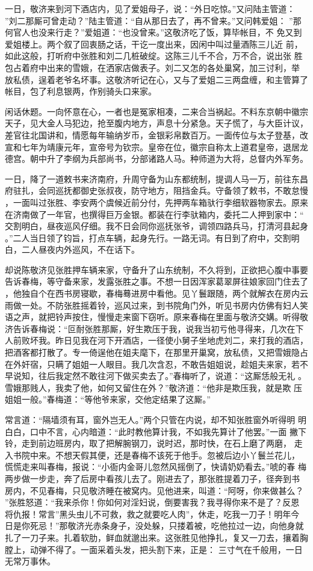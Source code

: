 一日，敬济来到河下酒店内，见了爱姐母子，说：“外日吃惊。”又问陆主管道：
”刘二那厮可曾走动？”陆主管道：“自从那日去了，再不曾来。”又问韩爱姐：
”那何官人也没来行走？”爱姐道：“也没曾来。”这敬济吃了饭，算毕帐目，不
免又到爱姐楼上。两个叙了回衷肠之话，干讫一度出来，因闲中叫过量酒陈三儿近
前，如此这般，打听府中张胜和刘二几桩破绽。这陈三儿千不合，万不合，说出张
胜包占着府中出来的雪娥，在洒家店做表子。刘二又怎的各处巢窝，加三讨利，举
放私债，逞着老爷名坏事。这敬济听记在心，又与了爱姐二三两盘缠，和主管算了
帐目，包了利息银两，作别骑头口来家。

闲话休题。一向怀意在心，一者也是冤家相凑，二来合当祸起。不料东京朝中徽宗
天子，见大金人马犯边，抢至腹内地方，声息十分紧急。天子慌了，与大臣计议，
差官往北国讲和，情愿每年输纳岁币，金银彩帛数百万。一面传位与太子登基，改
宣和七年为靖康元年，宣帝号为钦宗。皇帝在位，徽宗自称太上道君皇帝，退居龙
德宫。朝中升了李纲为兵部尚书，分部诸路人马。种师道为大将，总督内外军务。

一日，降了一道敕书来济南府，升周守备为山东都统制，提调人马一万，前往东昌
府驻扎，会同巡抚都御史张叔夜，防守地方，阻挡金兵。守备领了敕书，不敢怠慢
，一面叫过张胜、李安两个虞候近前分付，先押两车箱驮行李细软器物家去。原来
在济南做了一年官，也撰得巨万金银。都装在行李驮箱内，委托二人押到家中：“
交割明白，昼夜巡风仔细。我不日会同你巡抚张爷，调领四路兵马，打清河县起身
。”二人当日领了钧旨，打点车辆，起身先行。一路无词。有日到了府中，交割明
白，二人昼夜内外巡风，不在话下。

却说陈敬济见张胜押车辆来家，守备升了山东统制，不久将到，正欲把心腹中事要
告诉春梅，等守备来家，发露张胜之事。不想一日因浑家葛翠屏往娘家回门住去了
，他独自个在西书房寝歇，春梅蓦进房中看他。见丫鬟跟随，两个就解衣在房内云
雨做一处。不防张胜摇着铃，巡风过来，到书院角门外，听见书房内仿佛有妇人笑
语之声，就把铃声按住，慢慢走来窗下窃听。原来春梅在里面与敬济交媾。听得敬
济告诉春梅说：“叵耐张胜那厮，好生欺压于我，说我当初亏他寻得来，几次在下
人前败坏我。昨日见我在河下开酒店，一径使小舅子坐地虎刘二，来打我的酒店，
把酒客都打散了。专一倚逞他在姐夫麾下，在那里开巢窝，放私债，又把雪娥隐占
在外奸宿，只瞒了姐姐一人眼目。我几次含忍，不敢告姐姐说，趁姐夫来家，若不
早说知，往后我定然不敢往河下做买卖去了。”春梅听了，说道：“这厮恁般无礼
。雪娥那贱人，我卖了他，如何又留住在外？”敬济道：“他非是欺压我，就是欺
压姐姐一般。”春梅道：“等他爷来家，交他定结果了这厮。”

常言道：“隔墙须有耳，窗外岂无人。”两个只管在内说，却不知张胜窗外听得明
明白白，口中不言，心内暗道：“此时教他算计我，不如我先算计了他罢。”一面
撇下铃，走到前边班房内，取了把解腕钢刀，说时迟，那时快，在石上磨了两磨，
走入书院中来。不想天假其便，还是春梅不该死于他手。忽被后边小丫鬟兰花儿，
慌慌走来叫春梅，报说：“小衙内金哥儿忽然风摇倒了，快请奶奶看去。”唬的春
梅两步做一步走，奔了后房中看孩儿去了。刚进去了，那张胜提着刀子，径奔到书
房内，不见春梅，只见敬济睡在被窝内。见他进来，叫道：“阿呀，你来做甚么？
”张胜怒道：“我来杀你！你如何对淫妇说，倒要害我？我寻得你来不是了？反恩
将仇报！常言”黑头虫儿不可救，救之就要吃人肉”，休走，吃我一刀子！明年今
日是你死忌！”那敬济光赤条身子，没处躲，只搂着被，吃他拉过一边，向他身就
扎了一刀子来。扎着软肋，鲜血就邈出来。这张胜见他挣扎，复又一刀去，攘着胸
膛上，动弹不得了。一面采着头发，把头割下来，正是：
三寸气在千般用，一日无常万事休。

